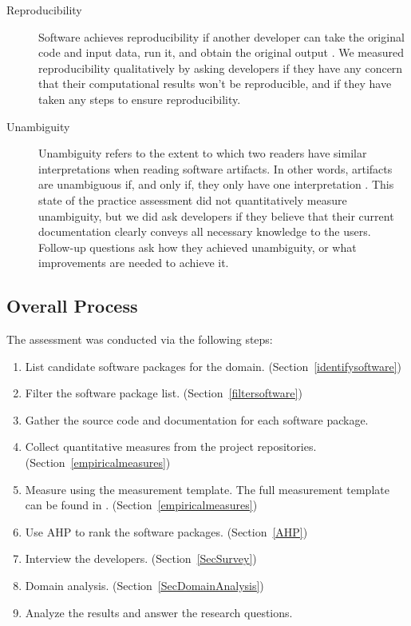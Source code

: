 \documentclass[final, 3p, times, authoryear]{elsarticle}
\begin{document}
\begin{description}
	\item[Reproducibility] Software achieves reproducibility if another
	developer can take the original code and input data, run it, and obtain the
	original output \citep{BenureauAndRougier2017}. We measured reproducibility
	qualitatively by asking developers if they have any concern that their
	computational results won't be reproducible, and if they have taken any
	steps to ensure reproducibility.
	
	\item[Unambiguity] Unambiguity refers to the extent to which two readers
	have similar interpretations when reading software artifacts. In other
	words, artifacts are unambiguous if, and only if, they only have one
	interpretation \citep{IEEE1998}. This state of the practice assessment did
	not quantitatively measure unambiguity, but we did ask developers if they
	believe that their current documentation clearly conveys all necessary
	knowledge to the users.  Follow-up questions ask how they achieved
	unambiguity, or what improvements are needed to achieve it.
				 
\end{description}

\subsection{Overall Process} \label{Sec_OverallProcess}

The assessment was conducted via the following steps: 

\begin{enumerate}
	\item List candidate software packages for the domain.
	(Section~\ref{identifysoftware})
	\item Filter the software package list. (Section~\ref{filtersoftware})
	\item Gather the source code and documentation for each software package.
	\item Collect quantitative measures from the project repositories.
	(Section~\ref{empiricalmeasures})
	\item Measure using the measurement template.  The full measurement template
	can be found in \citet{SmithEtAl2021}. (Section~\ref{empiricalmeasures})
	\item Use AHP to rank the software packages. (Section~\ref{AHP})
	\item Interview the developers. (Section~\ref{SecSurvey})
	\item Domain analysis. (Section~\ref{SecDomainAnalysis})
	\item Analyze the results and answer the research questions.
\end{enumerate}
\end{document}
